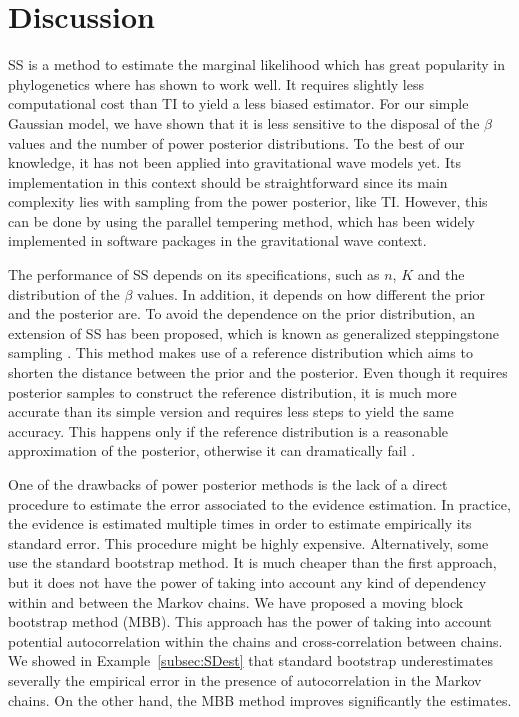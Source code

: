 \documentclass[aps,reprint,amsmath,amssymb,showpacs,showkeys]{revtex4-1}%
\begin{document}
\section{Discussion}
SS is a method to estimate the marginal likelihood which has great popularity in phylogenetics where has shown to work well.  It requires slightly less computational cost than TI to yield a less biased estimator.  For our simple Gaussian model, we have shown that it is less sensitive to the disposal of the $\beta$ values and the number of power posterior distributions.  To the best of our knowledge, it has not been applied into gravitational wave models yet.  Its implementation in this context should be straightforward since its main complexity lies with sampling from the power posterior, like TI.  However, this can be done by using the parallel tempering method, which has been widely implemented in software packages in the gravitational wave context. 

The performance of SS depends on its specifications, such as $n$, $K$ and the distribution of the $\beta$ values.  In addition, it depends on how different the prior and the posterior are.  To avoid the dependence on the prior distribution, an extension of SS has been proposed, which is known as generalized steppingstone sampling \citep[GSS;][]{fan:2011}.  This method makes use of a reference distribution which aims to shorten the distance between the prior and the posterior.  Even though it requires posterior samples to construct the reference distribution, it is much more accurate than its simple version and requires less steps to yield the same accuracy.  This happens only if the reference distribution is a reasonable approximation of the posterior, otherwise it can dramatically fail \citep{Maturana:2017b}.  

One of the drawbacks of power posterior methods is the lack of a direct procedure to estimate the error associated to the evidence estimation.  In practice, the evidence is estimated multiple times in order to estimate empirically its standard error.  This procedure might be highly expensive.  Alternatively, some use the standard bootstrap method.
It is much cheaper than the first approach, but it does not have the power of taking into account any kind of dependency within and between the Markov chains.  We have proposed a moving block bootstrap method (MBB).  This approach has the power of taking into account potential autocorrelation within the chains and cross-correlation between chains.  We showed in Example~\ref{subsec:SDest} that standard bootstrap underestimates severally the empirical error in the presence of autocorrelation in the Markov chains.  On the other hand, the MBB method improves significantly the estimates.   
\end{document}
